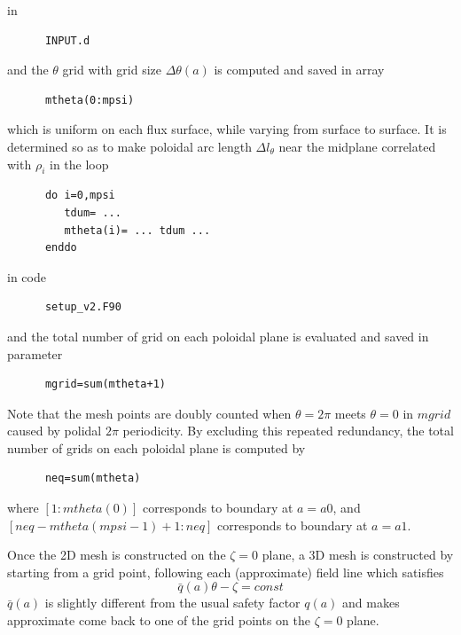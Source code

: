 \documentclass{report}
\begin{document}
\noindent
in

\begin{verbatim}
      INPUT.d
\end{verbatim}

\noindent
and the $\theta$ grid with grid size $\Delta \theta(a)$ is computed and saved in array

\begin{verbatim}
      mtheta(0:mpsi)
\end{verbatim}

\noindent
which is uniform on each flux surface, while varying from surface to surface.
It is determined so as to make poloidal arc length
$\Delta l_\theta$ near the midplane correlated with $\rho_i$ in the loop

\begin{verbatim}
      do i=0,mpsi
         tdum= ...
         mtheta(i)= ... tdum ...
      enddo
\end{verbatim}

\noindent
in code

\begin{verbatim}
      setup_v2.F90
\end{verbatim}

\noindent
and the total number of grid on each poloidal plane is evaluated and saved in parameter

\begin{verbatim}
      mgrid=sum(mtheta+1)
\end{verbatim}

\noindent
Note that the mesh points are doubly counted when $\theta=2\pi$ meets $\theta=0$ in $mgrid$
caused by polidal $2\pi$ periodicity.
By excluding this repeated redundancy, the total number of grids on each poloidal plane is computed by

\begin{verbatim}
      neq=sum(mtheta)
\end{verbatim}

\noindent
where $\left[ 1:mtheta(0) \right]$ corresponds to boundary at $a=a0$, and
      $\left[ neq-mtheta(mpsi-1)+1:neq \right]$ corresponds to boundary at $a=a1$.

Once the 2D mesh is constructed on the $\zeta=0$ plane,
a 3D mesh is constructed by starting from a grid point,
following each (approximate) field line which satisfies
$$
\bar{q}(a)\theta - \zeta = const
$$
$\bar{q}(a)$ is slightly different from the usual safety factor $q(a)$ 
and makes approximate come back to one of the grid points on the $\zeta=0$ plane.
\end{document}
